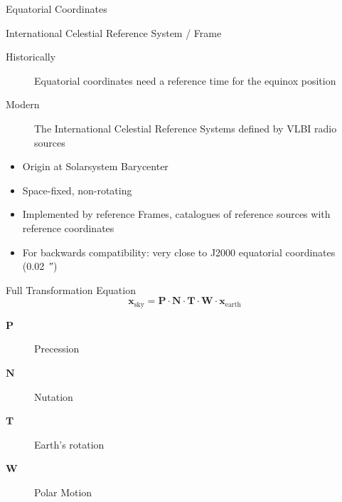 \documentclass[aspectratio=1610, 9pt]{beamer}
\begin{document}
\begin{frame}[t]{Equatorial Coordinates}

  \raggedright
\end{frame}

\begin{frame}[c]{International Celestial Reference System / Frame}

  \begin{description}
    \item[Historically] Equatorial coordinates need a reference time for the equinox position
    \item[Modern] The International Celestial Reference Systems defined by VLBI radio sources
  \end{description}

  \begin{itemize}
    \item Origin at Solarsystem Barycenter
    \item Space-fixed, non-rotating
    \item Implemented by reference Frames, catalogues of reference sources with reference coordinates
    \item For backwards compatibility: very close to J2000 equatorial coordinates (\SI{0.02}{\arcsecond})
  \end{itemize}

\end{frame}



\begin{frame}[c]{Full Transformation Equation}
  \Huge
  \begin{equation*}
    \symbf{x}_\text{sky} = \symbf{P} \cdot \symbf{N} \cdot \symbf{T} \cdot \symbf{W} \cdot \symbf{x}_\text{earth}
  \end{equation*}

  \large
  \begin{description}
    \item[$\symbf{P}$] Precession
    \item[$\symbf{N}$] Nutation
    \item[$\symbf{T}$] Earth's rotation
    \item[$\symbf{W}$] Polar Motion
  \end{description}
\end{frame}
\end{document}
